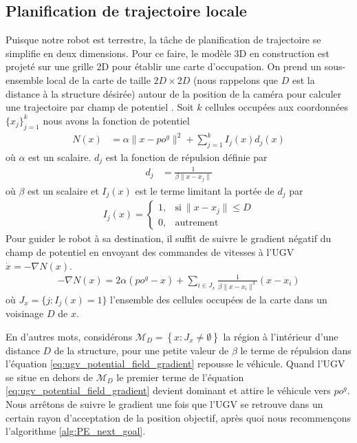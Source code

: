 \subsection{Planification de trajectoire locale}

Puisque notre robot est terrestre, la tâche de planification de trajectoire se simplifie en deux dimensions. Pour ce faire, le modèle 3D en construction est projeté sur une grille 2D pour établir une carte d'occupation. On prend un sous-ensemble local de la carte de taille $2D \times 2D$ (nous rappelons que $D$ est la distance à la structure désirée) autour de la position de la caméra pour calculer une trajectoire par champ de potentiel \citep{Khatib1990, Choset2005}. Soit $k$ cellules occupées aux coordonnées $\{x_j\}^k_{j=1}$ nous avons la fonction de potentiel
\begin{align}
  N(x) &= \alpha \| x - {po}^g \|^2 + \sum^k_{j=1} I_j(x)d_j(x)
\end{align}
où $\alpha$ est un scalaire. $d_j$ est la fonction de répulsion définie par
\begin{align}
  d_j &= \frac{1}{\beta \| x - x_j \|}
\end{align}
où $\beta$ est un scalaire et $I_j(x)$ est le terme limitant la portée de $d_j$ par
\begin{align}
  I_j(x) =     \begin{cases}
      1, & \text{si}\ \|x - x_j\| \leq D \\
      0, & \text{autrement}
    \end{cases}
\end{align}
Pour guider le robot à sa destination, il suffit de suivre le gradient négatif du champ de potentiel en envoyant des commandes de vitesses à l'UGV $\dot x = -\nabla N(x)$.
\begin{align}
  - \nabla N(x) = 2 \alpha ({po}^g - x) + \sum_{i \in J_x}\frac{1}{\beta \| x - x_i\|^3}(x - x_i)
  \label{eq:ugv_potential_field_gradient}
\end{align}
où $J_x = \{ j : I_j(x) = 1\}$ l'ensemble des cellules occupées de la carte dans un voisinage $D$ de $x$.

En d'autres mots, considérons $\mathcal M_D = \left\lbrace x : J_{x} \neq \emptyset \right\rbrace $ la région à l'intérieur d'une distance $D$ de la structure, pour une petite valeur de $\beta$ le terme de répulsion dans l'équation \ref{eq:ugv_potential_field_gradient} repousse le véhicule. Quand l'UGV se situe en dehors de $\mathcal M_D$ le premier terme de l'équation \ref{eq:ugv_potential_field_gradient} devient dominant et attire le véhicule vers $po^g$. Nous arrêtons de suivre le gradient une fois que l'UGV se retrouve dans un certain rayon d'acceptation de la position objectif, après quoi nous recommençons l'algorithme \ref{alg:PE_next_goal}.

